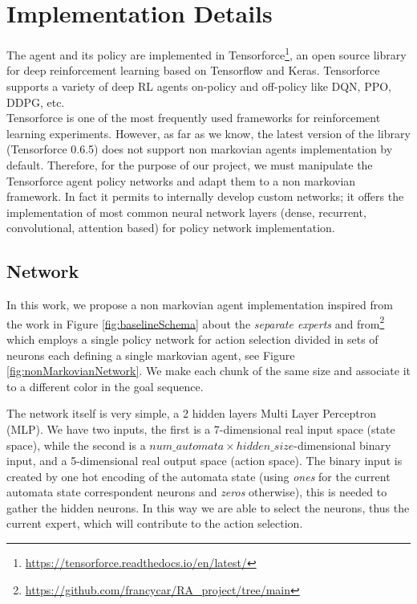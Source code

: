 \documentclass{article}
\begin{document}
\section{Implementation Details}\label{sec:ImplementationDetails}%

The agent and its policy are implemented in Tensorforce\footnote{\url{https://tensorforce.readthedocs.io/en/latest/}}, an open source library for deep reinforcement learning based on Tensorflow and Keras. Tensorforce supports a variety of deep RL agents on-policy and off-policy like DQN, PPO, DDPG, etc. \\
Tensorforce is one of the most frequently used frameworks for reinforcement learning experiments. However, as far as we know, the latest version of the library (Tensorforce 0.6.5) does not support non markovian agents implementation by default. Therefore, for the purpose of our project, we must manipulate the Tensorforce agent policy networks and adapt them to a non markovian framework. In fact it permits to internally develop custom networks; it offers the implementation of most common neural network layers (dense, recurrent, convolutional, attention based) for policy network implementation.

\subsection{Network} %
In this work, we propose a non markovian agent implementation inspired from the work in Figure \ref{fig:baselineSchema} about the \textit{separate experts} and from\footnote{\url{https://github.com/francycar/RA_project/tree/main}} which employs a single policy network for action selection divided in sets of neurons each defining a single markovian agent, see Figure \ref{fig:nonMarkovianNetwork}.
We make each chunk of the same size and associate it to a different color in the goal sequence. 

The network itself is very simple, a 2 hidden layers Multi Layer Perceptron (MLP). We have two inputs, the first is a 7-dimensional real input space (state space), while the second is a $num\_automata\times hidden\_size$-dimensional binary input, and a 5-dimensional real output space (action space). The binary input is created by one hot encoding of the automata state (using \textit{ones} for the current automata state correspondent neurons and \textit{zeros} otherwise), this is needed to gather the hidden neurons. In this way we are able to select the neurons, thus the current expert, which will contribute to the action selection.
\end{document}
